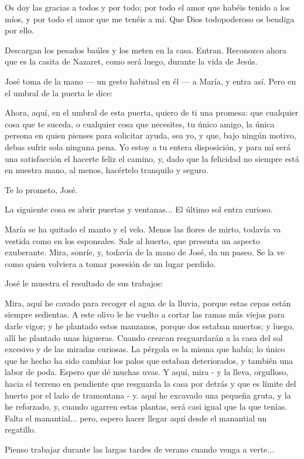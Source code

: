 \documentclass[12pt]{book} %
\begin{document}
Os doy las gracias a todos y por todo; por todo el amor que habéis tenido a los míos, y por todo el amor que me tenéis a mí. Que Dios todopoderoso os bendiga por ello. 

Descargan los pesados baúles y los meten en la casa. Entran. Reconozco ahora que es la casita de Nazaret, como será luego, durante la vida de Jesús. 

José toma de la mano — un gesto habitual en él — a María, y entra así. Pero en el umbral de la puerta le dice: 

Ahora, aquí, en el umbral de esta puerta, quiero de ti una promesa: que cualquier cosa que te suceda, o cualquier cosa que necesites, tu único amigo, la única persona en quien pienses para solicitar ayuda, sea yo, y que, bajo ningún motivo, debas sufrir sola ninguna pena. Yo estoy a tu entera disposición, y para mí será una satisfacción el hacerte feliz el camino, y, dado que la felicidad no siempre está en nuestra mano, al menos, hacértelo tranquilo y seguro. 

Te lo prometo, José. 

La siguiente cosa es abrir puertas y ventanas... El último sol entra curioso. 

María se ha quitado el manto y el velo. Menos las flores de mirto, todavía va vestida como en los esponsales. Sale al huerto, que presenta un aspecto exuberante. Mira, sonríe, y, todavía de la mano de José, da un paseo. Se la ve como quien volviera a tomar posesión de un lugar perdido. 

José le muestra el resultado de sus trabajos: 

Mira, aquí he cavado para recoger el agua de la lluvia, porque estas cepas están siempre sedientas. A este olivo le he vuelto a cortar las ramas más viejas para darle vigor; y he plantado estos manzanos, porque dos estaban muertos; y luego, allí he plantado unas higueras. Cuando crezcan resguardarán a la casa del sol excesivo y de las miradas curiosas. La pérgola es la misma que había; lo único que he hecho ha sido cambiar los palos que estaban deteriorados, y también una labor de poda. Espero que dé muchas uvas. Y aquí, mira - y la lleva, orgulloso, hacia el terreno en pendiente que resguarda la casa por detrás y que es límite del huerto por el lado de tramontana - y. aquí he excavado una pequeña gruta, y la he reforzado, y, cuando agarren estas plantas, será casi igual que la que tenías. Falta el manantial... pero, espero hacer llegar aquí desde el manantial un regatillo. 

Pienso trabajar durante las largas tardes de verano cuando venga a verte... 
\end{document}
